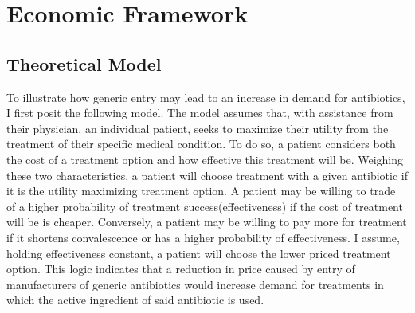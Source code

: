 \chapter{Economic Framework}
\section{Theoretical Model}
To illustrate how generic entry may lead to an increase in demand for antibiotics, I first posit the following model. The model assumes that, with assistance from their physician, an individual patient, seeks to maximize their utility from the treatment of their specific medical condition. To do so, a patient considers both the cost of a treatment option and how effective this treatment will be. Weighing these two characteristics, a patient will choose treatment with a given antibiotic if it is the utility maximizing treatment option. A patient may be willing to trade of a higher probability of treatment success(effectiveness) if the cost of treatment will be is cheaper. Conversely, a patient may be willing to pay more for treatment if it shortens convalescence or has a higher probability of effectiveness. I assume, holding effectiveness constant, a patient will choose the lower priced treatment option. This logic indicates that a reduction in price caused by entry of manufacturers of generic antibiotics would increase demand for treatments in which the active ingredient of said antibiotic is used.

